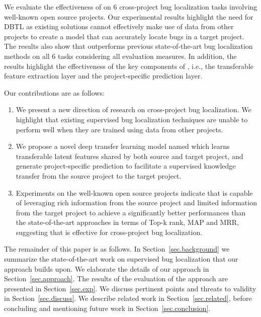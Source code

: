 
We evaluate the effectiveness of \TRANPCNN on 6 cross-project bug localization tasks involving well-known open source projects. Our experimental results highlight the need for DBTL as existing solutions cannot effectively make use of data from other projects to create a model that can accurately locate bugs in a target project. The results also show that \TRANPCNN outperforms previous state-of-the-art bug localization methods on all 6 tasks considering all evaluation measures. In addition, the results highlight the effectiveness of the key components of \TRANPCNN, i.e., the transferable feature extraction layer and the project-specific prediction layer.

Our contributions are as follows:

\begin{enumerate}

\item We present a new direction of research on cross-project bug localization. We highlight that existing supervised bug localization techniques are unable to perform well when they are trained using data from other projects. 
    
\item We propose a novel deep transfer learning model named \TRANPCNN which learns transferable latent features shared by both source and target project, and generate project-specific prediction to facilitate a supervised knowledge transfer from the source project to the target project.



\item Experiments on the well-known open source projects indicate that \TRANPCNN is capable of leveraging rich information from the source project and limited information from the target project to achieve a significantly better performances than the state-of-the-art approaches in terms of Top-k rank, MAP and MRR, suggesting that \TRANPCNN is effective for cross-project bug localization.


\end{enumerate}

The remainder of this paper is as follows. In Section~\ref{sec.background} we summarize the state-of-the-art work on supervised bug localization that our approach builds upon. We elaborate the details of our approach in Section~\ref{sec.approach}. The results of the evaluation of the approach are presented in Section~\ref{sec.exp}. We discuss pertinent points and threats to validity in Section~\ref{sec.discuss}. We describe related work in Section~\ref{sec.related}, before concluding and mentioning future work in Section~\ref{sec.conclusion}. 

